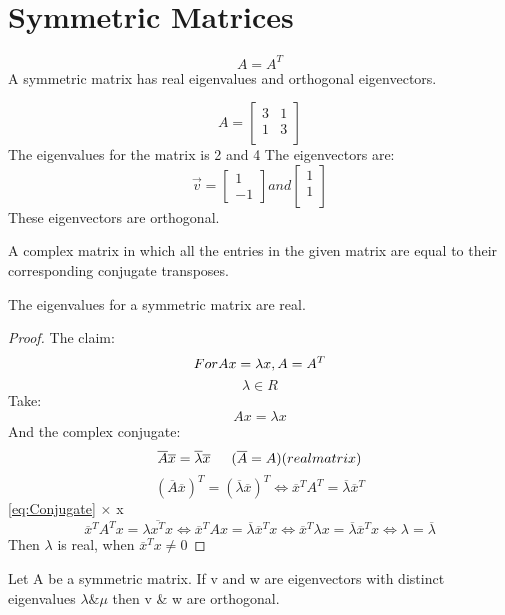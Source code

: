 \documentclass[twoside]{report}
\begin{document}
\section{Symmetric Matrices} %
\label{sec:Symmetric Matrices}
\[
	A = A^T
\]
A symmetric matrix has real eigenvalues and orthogonal eigenvectors.
\begin{example}
	\[
	   A =
	   \begin{bmatrix}
	      3 & 1\\
	      1 & 3\\
	   \end{bmatrix}
	\]
	The eigenvalues for the matrix is 2 and 4
	The eigenvectors are:
	\[
	   \vec{v} = 
	   \begin{bmatrix}
	   	1 \\
		-1
	   \end{bmatrix}
	   and
	   \begin{bmatrix}
	   	1 \\
		1 \\
	   \end{bmatrix}
	\]
	These eigenvectors are orthogonal.
\end{example}
\begin{definition}
	A complex matrix in which all the entries in the given matrix are equal to their corresponding conjugate transposes.
\end{definition}
\begin{theorem}
   The eigenvalues for a symmetric matrix are real.
\end{theorem}
\begin{proof}
   The claim:
	\[
	For \\	Ax = \lambda x, A = A^T \\
	\]
	\[
		\lambda \in R
	\]
	Take:
	\[
		A x = \lambda x
	\]
	And the complex conjugate:
	\[
	   \overline{A}\overline{x} = \overline{\lambda} \overline{x} \indent  (\overline{A} = A)(real \\ matrix)
	\]
\begin{equation}
	   (\overline{A}\overline{x})^T = (\overline{\lambda} \overline{x})^T \iff \overline{x}^T A^T = \overline{\lambda} \overline{x}^T
	\label{eq:Conjugate}
\end{equation}	
\ref{eq:Conjugate} $\times$ x
\[
   \overline{x}^T A^T x = \lambda \overline{x^T} x \iff \overline{x}^T A x = \overline{\lambda} \overline{x}^T x \iff \overline{x}^T \lambda x = \overline{\lambda} \overline{x}^T x \iff \lambda = \overline{\lambda}
\]
Then $\lambda$ is real, when $\overline{x}^T x \neq 0$
\end{proof}
\begin{lemma}
   Let A be a symmetric matrix. If v and w are eigenvectors with distinct eigenvalues $\lambda \& \mu$ then v \& w are orthogonal.
\end{lemma}
\end{document}
